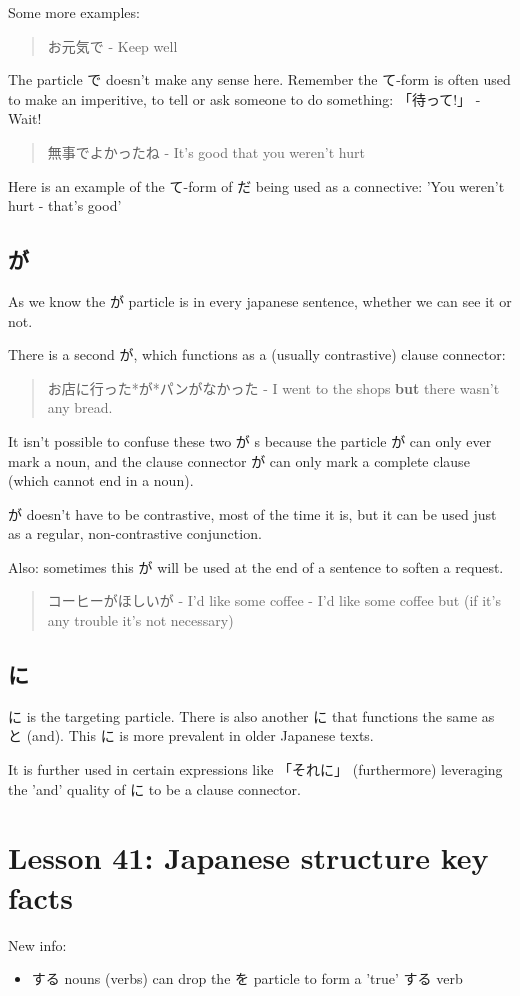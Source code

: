 \documentclass[11pt]{article}
\begin{document}
Some more examples:
\begin{quote}
お元気で - Keep well
\end{quote}
The particle で doesn't make any sense here. Remember the て-form is often used to make an imperitive, to tell or ask someone to do something: 「待って!」 - Wait!

\begin{quote}
無事でよかったね - It's good that you weren't hurt
\end{quote}
Here is an example of the て-form of だ being used as a connective: 'You weren't hurt - that's good'

\subsection{が}
\label{sec:orga57257e}
As we know the が particle is in every japanese sentence, whether we can see it or not.

There is a second が, which functions as a (usually contrastive) clause connector:
\begin{quote}
お店に行った*が*パンがなかった - I went to the shops \textbf{but} there wasn't any bread.
\end{quote}

It isn't possible to confuse these two が s because the particle が can only ever mark a noun, and the clause connector が can only mark a complete clause (which cannot end in a noun).

が doesn't have to be contrastive, most of the time it is, but it can be used just as a regular, non-contrastive conjunction.

Also: sometimes this が will be used at the end of a sentence to soften a request.
\begin{quote}
コーヒーがほしいが - I'd like some coffee - I'd like some coffee but (if it's any trouble it's not necessary)
\end{quote}

\subsection{に}
\label{sec:orgbc261b4}
に is the targeting particle. There is also another に that functions the same as と (and). This に is more prevalent in older Japanese texts.

It is further used in certain expressions like 「それに」 (furthermore) leveraging the 'and' quality of に to be a clause connector.
\section{Lesson 41: Japanese structure key facts}
\label{sec:org9929a4d}
New info:
\begin{itemize}
\item する nouns (verbs) can drop the を particle to form a 'true' する verb
\end{itemize}
\end{document}
